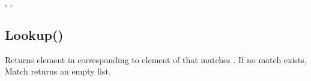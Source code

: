 \documentclass[letterpaper,10pt,english]{sphinxmanual}
\begin{document}
\sphinxAtStartPar
{}, , 

\ignorespaces 

\subsection{Lookup()}
\label{\detokenize{reference/utility:lookup}}\label{\detokenize{reference/utility:index-26}}
\sphinxAtStartPar
{}

\sphinxAtStartPar
Returns element in  corresponding to element of  that matches .  If no match exists, Match returns an empty list.

\sphinxAtStartPar
{}

\begin{sphinxVerbatim}[commandchars=\\\{\}]
\end{sphinxVerbatim}

\sphinxAtStartPar
{}
\end{document}
